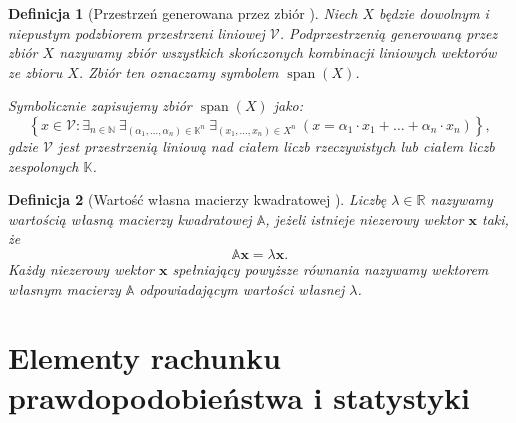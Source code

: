 \documentclass[12pt,a4paper]{report}
\newtheorem{df}{Definicja}[chapter]
\newcommand{\set}[1]{\left\lbrace {#1} \right\rbrace}
\newcommand{\setR}{\mathbb{R}}
\newcommand{\setK}{\mathbb{K}}
\newcommand{\setN}{\mathbb{N}}
\newcommand{\przestrzen}[1]{\operatorname{span}\left({#1} \right)}
\begin{document}
\begin{df}[Przestrzeń generowana przez zbiór {\citep[Sec 7.1 Def 7.13]{alzega}}]
Niech $\mathit{X}$ będzie dowolnym i niepustym podzbiorem przestrzeni liniowej $\mathcal{V}$. Podprzestrzenią generowaną przez zbiór $\mathit{X}$ nazywamy zbiór wszystkich  skończonych kombinacji liniowych wektorów ze zbioru $\mathit{X}$. Zbiór ten oznaczamy symbolem $\przestrzen{\mathit{X}}$.

Symbolicznie zapisujemy zbiór $\przestrzen{\mathit{X}}$ jako:
$$
\set{x \in \mathcal{V} : \exists_{n \in \setN} \: \exists_{(\alpha_1, \ldots, \alpha_n) \in \setK^n } \: \exists_{(x_1, \ldots, x_n) \in \mathit{X}^n} \: (x = \alpha_1 \cdot x_1 + \ldots + \alpha_n \cdot x_n)},
$$
gdzie $\mathcal{V}$ jest przestrzenią liniową nad ciałem liczb rzeczywistych lub ciałem liczb zespolonych $\setK$.
\end{df}

\begin{df}[Wartość własna macierzy kwadratowej {\citep[Sec 12.2]{alzega}}]
Liczbę $\lambda \in \setR$ nazywamy wartością własną macierzy kwadratowej $\mathbb{A}$, jeżeli istnieje niezerowy wektor $\mathbf{x}$ taki, że
$$
\mathbb{A}\mathbf{x}=\lambda\mathbf{x}.
$$
Każdy niezerowy wektor $\mathbf{x}$ spełniający powyższe równania nazywamy wektorem własnym macierzy $\mathbb{A}$ odpowiadającym wartości własnej $\lambda$.
\end{df}

\section{Elementy rachunku prawdopodobieństwa i statystyki}
\end{document}
